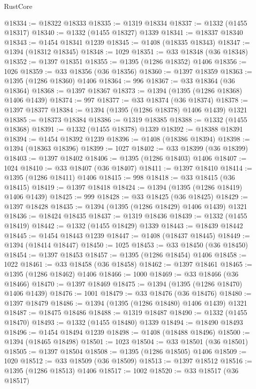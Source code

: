 \begin{lexlean}{RustCore}
\begin{coremodule}
@18334 := @18322 @18333
@18335 := @1319 @18334
@18337 := @1332 (@1455 @18317)
@18340 := @1332 (@1455 @18327) @1339
@18341 := @18337 @18340
@18343 := @1454 @18341 @1239
@18345 := @1408 (@18335 @18343)
@18347 := @1394 (@18312 @18345)
@18348 := 1029
@18351 := @33 @18348 (@36 @18348)
@18352 := @1397 @18351
@18355 := @1395 (@1286 @18352) @1406
@18356 := 1026
@18359 := @33 @18356 (@36 @18356)
@18360 := @1397 @18359
@18363 := @1395 (@1286 @18360) @1406
@18364 := 996
@18367 := @33 @18364 (@36 @18364)
@18368 := @1397 @18367
@18373 := @1394 (@1395 (@1286 @18368) @1406 @1439)
@18374 := 997
@18377 := @33 @18374 (@36 @18374)
@18378 := @1397 @18377
@18384 := @1394 (@1395 (@1286 @18378) @1406 @1439) @1321
@18385 := @18373 @18384
@18386 := @1319 @18385
@18388 := @1332 (@1455 @18368)
@18391 := @1332 (@1455 @18378) @1339
@18392 := @18388 @18391
@18394 := @1454 @18392 @1239
@18396 := @1408 (@18386 @18394)
@18398 := @1394 (@18363 @18396)
@18399 := 1027
@18402 := @33 @18399 (@36 @18399)
@18403 := @1397 @18402
@18406 := @1395 (@1286 @18403) @1406
@18407 := 1024
@18410 := @33 @18407 (@36 @18407)
@18411 := @1397 @18410
@18414 := @1395 (@1286 @18411) @1406
@18415 := 998
@18418 := @33 @18415 (@36 @18415)
@18419 := @1397 @18418
@18424 := @1394 (@1395 (@1286 @18419) @1406 @1439)
@18425 := 999
@18428 := @33 @18425 (@36 @18425)
@18429 := @1397 @18428
@18435 := @1394 (@1395 (@1286 @18429) @1406 @1439) @1321
@18436 := @18424 @18435
@18437 := @1319 @18436
@18439 := @1332 (@1455 @18419)
@18442 := @1332 (@1455 @18429) @1339
@18443 := @18439 @18442
@18445 := @1454 @18443 @1239
@18447 := @1408 (@18437 @18445)
@18449 := @1394 (@18414 @18447)
@18450 := 1025
@18453 := @33 @18450 (@36 @18450)
@18454 := @1397 @18453
@18457 := @1395 (@1286 @18454) @1406
@18458 := 1022
@18461 := @33 @18458 (@36 @18458)
@18462 := @1397 @18461
@18465 := @1395 (@1286 @18462) @1406
@18466 := 1000
@18469 := @33 @18466 (@36 @18466)
@18470 := @1397 @18469
@18475 := @1394 (@1395 (@1286 @18470) @1406 @1439)
@18476 := 1001
@18479 := @33 @18476 (@36 @18476)
@18480 := @1397 @18479
@18486 := @1394 (@1395 (@1286 @18480) @1406 @1439) @1321
@18487 := @18475 @18486
@18488 := @1319 @18487
@18490 := @1332 (@1455 @18470)
@18493 := @1332 (@1455 @18480) @1339
@18494 := @18490 @18493
@18496 := @1454 @18494 @1239
@18498 := @1408 (@18488 @18496)
@18500 := @1394 (@18465 @18498)
@18501 := 1023
@18504 := @33 @18501 (@36 @18501)
@18505 := @1397 @18504
@18508 := @1395 (@1286 @18505) @1406
@18509 := 1020
@18512 := @33 @18509 (@36 @18509)
@18513 := @1397 @18512
@18516 := @1395 (@1286 @18513) @1406
@18517 := 1002
@18520 := @33 @18517 (@36 @18517)

\end{coremodule}
\end{lexlean}
